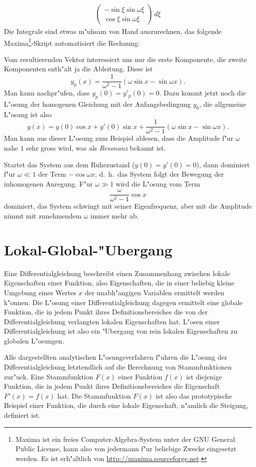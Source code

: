 \begin{beispiel}
\begin{align*}
\begin{pmatrix}
-\sin \xi\sin\omega\xi\\
 \cos \xi\sin\omega\xi
\end{pmatrix}
\,d\xi
\end{align*}
Die Integrale sind etwas m"uhsam von Hand auszurechnen, das folgende
Maxima\footnote{Maxima ist ein freies Computer-Algebra-System unter der
GNU General Public License, kann also von jedermann f"ur beliebige
Zwecke eingesetzt werden. Es ist erh"altlich von
\url{http://maxima.sourceforge.net}.}-Skript automatisiert
die Rechnung:

%
Vom resultierenden Vektor interessiert uns nur die erste Komponente,
die zweite Komponenten enth"alt ja die Ableitung.
Diese ist
\[
y_p(x)=\frac1{\omega^2-1}(\omega\sin x-\sin\omega x).
\]
Man kann nachpr"ufen, dass $y_p(0)=y'_p(0)=0$.
Dazu kommt jetzt noch die L"osung der homogenen Gleichung mit der
Anfangsbedingung $y_0$, die allgemeine L"osung ist also
\[
y(x)=y(0) \cos x +y'(0)\sin x+\frac1{\omega^2-1}(\omega\sin x -\sin\omega x).
\]
Man kann aus dieser L"osung zum Beispiel ablesen, dass die Amplitude
%
f"ur $\omega$ nahe $1$ sehr gross wird, was als {\em Resonanz} bekannt ist.

Startet das System aus dem Ruhezustand ($y(0)=y'(0)=0$), dann dominiert
f"ur $\omega\ll 1$ der Term $-\cos\omega x$, d.~h.~das System folgt der
Bewegung der inhomogenen Anregung.
F"ur $\omega \gg 1$ wird die L"osung vom Term
\[
\frac{\omega}{\omega^2-1}\cos x
\]
dominiert, das System schwingt mit seiner Eigenfrequenz, aber mit die
Amplitude nimmt mit zunehmendem $\omega$ immer mehr ab.
\end{beispiel}

\section{Lokal-Global-"Ubergang}
Eine Differentialgleichung beschreibt einen Zusammenhang zwischen
lokale Eigenschaften einer Funktion, also Eigenschaften, die in einer
beliebig kleine Umgebung eines Wertes $x$ der unabh"angigen Variablen
ermittelt werden k"onnen.
Die L"osung einer Differentialgleichung dagegen ermittelt eine globale
Funktion, die in jedem Punkt ihres Definitionsbereiches die von der
Differentialgleichung verlangten lokalen Eigenschaften hat.
L"osen einer Differentialgleichung ist also ein "Ubergang von rein lokalen
Eigenschaften zu globalen L"osungen.

Alle dargestellten analytischen L"osungsverfahren f"uhren die L"osung
der Differentialgleichung letztendlich auf die Berechnung von Stammfunktionen
zur"uck.
Eine Stammfunktion $F(x)$ einer Funktion $f(x)$ ist diejenige Funktion,
die in jedem Punkt ihres Definitionsbereiches die Eigenschaft $F'(x)=f(x)$
hat.
Die Stammfunktion $F(x)$ ist also das prototypische Beispiel einer Funktion,
die durch eine lokale Eigenschaft, n"amlich die Steigung, definiert ist.

